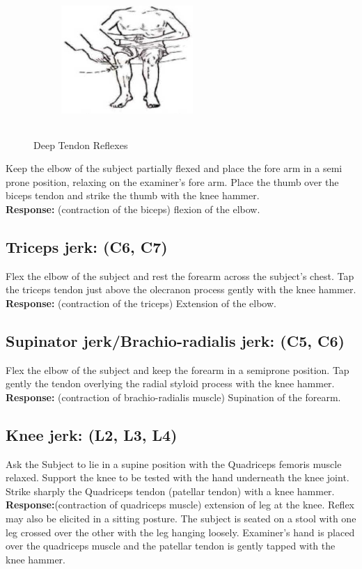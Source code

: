 \documentclass[a4paper,12pt,openany,oneside]{book}
\begin{document}
{\begin{figure}[H]
		\begin{subfigure}[t]{.29\textwidth}
			\centering
			\includegraphics[width=5cm,height=5cm]{./clinicalPhysioPic/reflexes/kneeJerk_2.jpg}
		\end{subfigure}
		\caption*{Deep Tendon Reflexes}
	\end{figure}
}
Keep the elbow of the subject partially flexed and place the fore arm in a semi prone position, relaxing on the examiner's fore arm. Place the thumb over the biceps tendon and strike the thumb with the knee hammer.\\
\textbf{Response:} (contraction of the biceps) flexion of the elbow.
\subsection*{Triceps jerk: (C6, C7)}
Flex the elbow of the subject and rest the forearm across the subject's chest. Tap the triceps tendon just above the olecranon process gently with the knee hammer.\\
\textbf{Response:} (contraction of the triceps) Extension of the elbow.
\subsection*{Supinator jerk/Brachio-radialis jerk: (C5, C6)}
Flex the elbow of the subject and keep the forearm in a semiprone position. Tap gently the tendon overlying the radial styloid process with the knee hammer.\\
\textbf{Response:} (contraction of brachio-radialis muscle) Supination of the forearm.
\subsection*{Knee jerk: (L2, L3, L4)}
Ask the Subject to lie in a supine position with the Quadriceps femoris muscle relaxed. Support the knee to be tested with the hand underneath the knee joint. Strike sharply the Quadriceps tendon (patellar tendon) with a knee hammer.\\
\textbf{Response:}(contraction of quadriceps muscle) extension of leg at the knee. Reflex may also be elicited in a sitting posture. The subject is seated on a stool with one leg crossed over the other with the leg hanging loosely. Examiner's hand is placed over the quadriceps muscle and the patellar tendon is gently tapped with the knee hammer.
\end{document}

